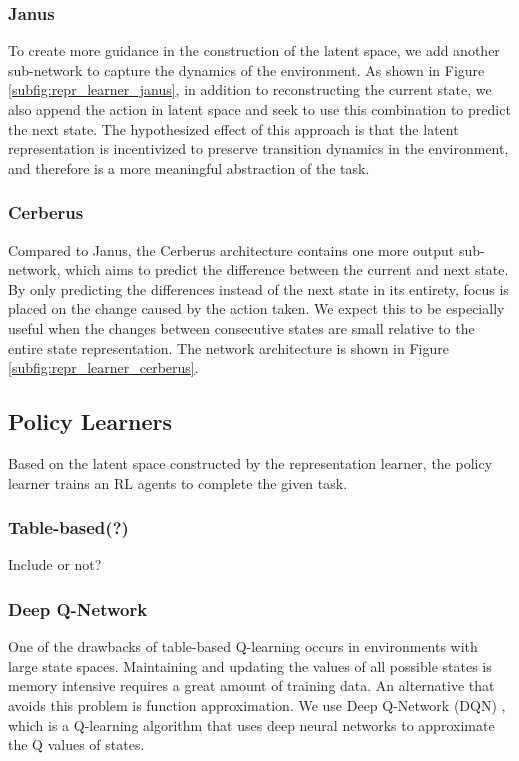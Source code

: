 \subsubsection{Janus}
To create more guidance in the construction of the latent space, we add another sub-network to capture the dynamics of the environment. 
As shown in Figure \ref{subfig:repr_learner_janus},
in addition to reconstructing the current state, we also append the action in latent space and seek to use this combination to predict the next state.
The hypothesized effect of this approach is that the latent representation is incentivized to preserve transition dynamics in the environment, and therefore is a more meaningful abstraction of the task.

\subsubsection{Cerberus}
Compared to Janus, the Cerberus architecture contains one more output sub-network, which aims to predict the difference between the current and next state. 
By only predicting the differences instead of the next state in its entirety, focus is placed on the change caused by the action taken.
We expect this to be especially useful when the changes between consecutive states are small relative to the entire state representation.
The network architecture is shown in Figure \ref{subfig:repr_learner_cerberus}.  

\subsection{Policy Learners}
Based on the latent space constructed by the representation learner, the policy learner trains an RL agents to complete the given task.

\subsubsection{Table-based(?)}
Include or not?

\subsubsection{Deep Q-Network}
One of the drawbacks of table-based Q-learning occurs in environments with large state spaces.
Maintaining and updating the values of all possible states is memory intensive requires a great amount of training data.
An alternative that avoids this problem is function approximation. 
We use Deep Q-Network (DQN) \citep{DQN}, which is a Q-learning algorithm that uses deep neural networks to approximate the Q values of states.

